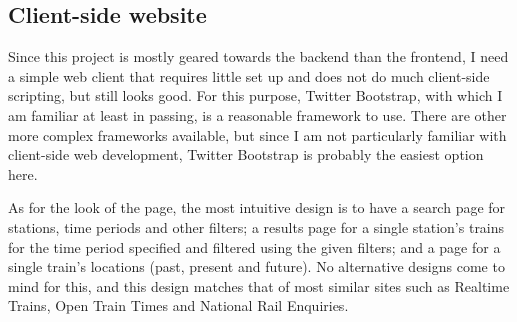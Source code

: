 \documentclass[a4paper,12pt]{article}
\begin{document}
\subsection{Client-side website}

Since this project is mostly geared towards the backend than the frontend, I
need a simple web client that requires little set up and does not do much
client-side scripting, but still looks good. For this purpose, Twitter
Bootstrap, with which I am familiar at least in passing, is a reasonable
framework to use. There are other more complex frameworks available, but since
I am not particularly familiar with client-side web development, Twitter
Bootstrap is probably the easiest option here.

As for the look of the page, the most intuitive design is to have a search page
for stations, time periods and other filters; a results page for a single
station's trains for the time period specified and filtered using the given
filters; and a page for a single train's locations (past, present and future).
No alternative designs come to mind for this, and this design matches that of
most similar sites such as Realtime Trains, Open Train Times and National Rail
Enquiries.
\end{document}
